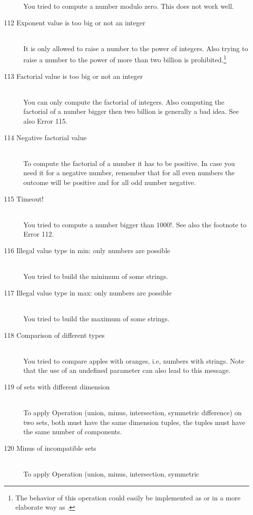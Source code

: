\begin{description}
   You tried to compute a number modulo zero. This does not work well.
\item[112 Exponent value \code{xxx} is too big or not an integer]\ \\
   It is only allowed to raise a number to the power of integers. Also trying to
   raise a number to the power of more than two billion is 
   prohibited.\footnote{The behavior of this operation could 
   easily be implemented as  or in a more elaborate way as 
   .}
\item[113 Factorial value \code{xxx} is too big or not an integer]\ \\
   You can only compute the factorial of integers.
   Also computing the factorial of a number bigger then two billion
   is generally a bad idea. See also Error 115.
\item[114 Negative factorial value]\ \\
   To compute the factorial of a number it has to be positive.
   In case you need it for a negative number, remember that for all 
   even numbers the outcome will be positive and for all odd number negative.
\item[115 Timeout!]\ \\
   You tried to compute a number bigger than $1000!$. 
   See also the footnote to Error 112.
\item[116 Illegal value type in min: \code{xxx} only numbers are
   possible]\ \\
   You tried to build the minimum of some strings.
\item[117 Illegal value type in max: \code{xxx} only numbers are
   possible]\ \\
   You tried to build the maximum of some strings.
\item[118 Comparison of different types]\ \\
   You tried to compare apples with oranges, i.e, numbers with
   strings. Note that the use of an undefined parameter can also
   lead to this message.
\item[119 \code{xxx} of sets with different dimension]\ \\
   To apply Operation  (union, minus, intersection, symmetric
   difference) on two sets, 
   both must have the same dimension tuples,\ie
   the tuples must have the same number of components.
\item[120 Minus of incompatible sets]\ \\
   To apply Operation  (union, minus, intersection, symmetric

\end{description}

